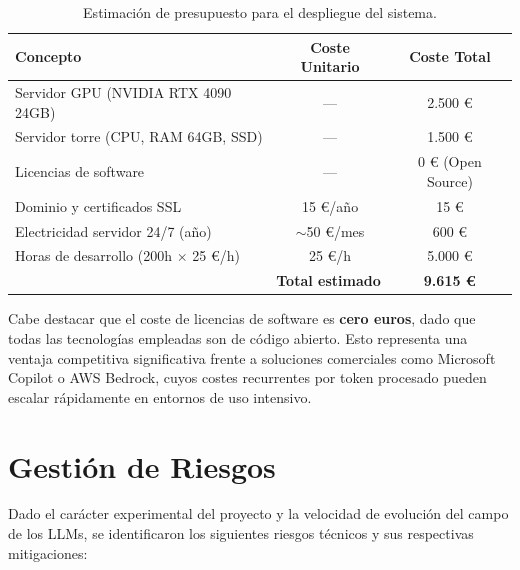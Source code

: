 \begin{table}[H]
\centering
\caption{Estimación de presupuesto para el despliegue del sistema.}
\label{tab:presupuesto}
\begin{tabular}{lcc}
\toprule
\textbf{Concepto} & \textbf{Coste Unitario} & \textbf{Coste Total} \\
\midrule
Servidor GPU (NVIDIA RTX 4090 24GB) & --- & 2.500 \euro{} \\
Servidor torre (CPU, RAM 64GB, SSD) & --- & 1.500 \euro{} \\
Licencias de software & --- & 0 \euro{} (Open Source) \\
Dominio y certificados SSL & 15 \euro{}/año & 15 \euro{} \\
Electricidad servidor 24/7 (año) & $\sim$50 \euro{}/mes & 600 \euro{} \\
\midrule
Horas de desarrollo (200h $\times$ 25 \euro{}/h) & 25 \euro{}/h & 5.000 \euro{} \\
\midrule
\multicolumn{2}{r}{\textbf{Total estimado}} & \textbf{9.615 \euro{}} \\
\bottomrule
\end{tabular}
\end{table}

Cabe destacar que el coste de licencias de software es \textbf{cero euros}, dado que todas las tecnologías empleadas son de código abierto. Esto representa una ventaja competitiva significativa frente a soluciones comerciales como Microsoft Copilot o AWS Bedrock, cuyos costes recurrentes por token procesado pueden escalar rápidamente en entornos de uso intensivo.

\section{Gestión de Riesgos}

Dado el carácter experimental del proyecto y la velocidad de evolución del campo de los LLMs, se identificaron los siguientes riesgos técnicos y sus respectivas mitigaciones:

